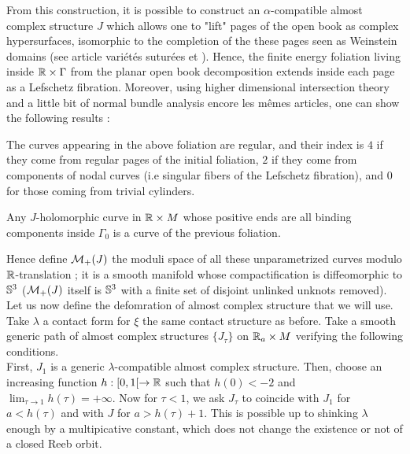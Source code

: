 \documentclass[../main.tex]{subfiles}
\begin{document}
From this construction, it is possible to construct an $\alpha$-compatible almost complex structure $J$ which allows one to "lift" pages of the open book as complex hypersurfaces, isomorphic to the completion of the these pages seen as Weinstein domains (see \color{red}article variétés suturées et \cite{roux_cas_nodate}\color{black}). Hence, the finite energy foliation living inside $\mathbb{R}\times \Gamma$ from the planar open book decomposition extends inside each page as a Lefschetz fibration. Moreover, using higher dimensional intersection theory and a little bit of normal bundle analysis \color{red}encore les mêmes articles\color{black}, one can show the following results :

\begin{lemma}
The curves appearing in the above foliation are regular, and their index is $4$ if they come from regular pages of the initial foliation, $2$ if they come from components of nodal curves (i.e singular fibers of the Lefschetz fibration), and $0$ for those coming from trivial cylinders. 
\end{lemma}

\begin{lemma}
Any $J$-holomorphic curve in $\mathbb{R}\times M$ whose positive ends are all binding components inside $\Gamma_0$ is a curve of the previous foliation.
\end{lemma}

Hence define $\mathcal{M}_+(J)$ the moduli space of all these unparametrized curves modulo $\mathbb{R}$-translation ; it is a smooth manifold whose compactification is diffeomorphic to $\mathbb{S}^3$ ($\mathcal{M}_+(J)$ itself is $\mathbb{S}^3$ with a finite set of disjoint unlinked unknots removed).\\

Let us now define the defomration of almost complex structure that we will use. Take $\lambda$ a contact form for $\xi$ the same contact structure as before. Take a smooth generic path of almost complex structures $\{J_\tau\}$ on $\mathbb{R}_a\times M$ verifying the following conditions.\\

First, $J_1$ is a generic $\lambda$-compatible almost complex structure. Then, choose an increasing function $h : [0,1[\rightarrow \mathbb{R}$ such that $h(0) < -2$ and $\displaystyle\lim_{\tau\rightarrow 1}h(\tau) = +\infty$. Now for $\tau < 1$, we ask $J_\tau$ to coincide with $J_1$ for $a< h(\tau)$ and with $J$ for $a> h(\tau) + 1$. This is possible up to shinking $\lambda$ enough by a multipicative constant, which does not change the existence or not of a closed Reeb orbit.\\
\end{document}
